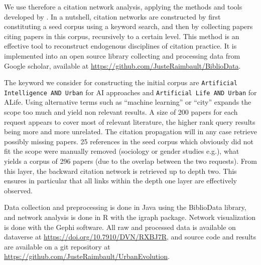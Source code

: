 \documentclass[letterpaper]{article}
\begin{document}
We use therefore a citation network analysis, applying the methods and tools developed by \cite{raimbault2019exploration}. In a nutshell, citation networks are constructed by first constituting a seed corpus using a keyword search, and then by collecting papers citing papers in this corpus, recursively to a certain level. This method is an effective tool to reconstruct endogenous disciplines of citation practice. It is implemented into an open source library collecting and processing data from Google scholar, available at \url{https://github.com/JusteRaimbault/BiblioData}.


The keyword we consider for constructing the initial corpus are \texttt{Artificial Intelligence AND Urban} for AI approaches and \texttt{Artificial Life AND Urban} for ALife. Using alternative terms such as ``machine learning'' or ``city'' expands the scope too much and yield non relevant results. A size of 200 papers for each request appears to cover most of relevant literature, the higher rank query results being more and more unrelated. The citation propagation will in any case retrieve possibly missing papers. 25 references in the seed corpus which obviously did not fit the scope were manually removed (sociology or gender studies e.g.), what yields a corpus of 296 papers (due to the overlap between the two requests). From this layer, the backward citation network is retrieved up to depth two. This ensures in particular that all links within the depth one layer are effectively observed.



Data collection and preprocessing is done in Java using the BiblioData library, and network analysis is done in R with the igraph package. Network visualization is done with the Gephi software. All raw and processed data is available on dataverse at \url{https://doi.org/10.7910/DVN/RXBJ7R}, and source code and results are available on a git repository at \url{https://github.com/JusteRaimbault/UrbanEvolution}.

\end{document}
